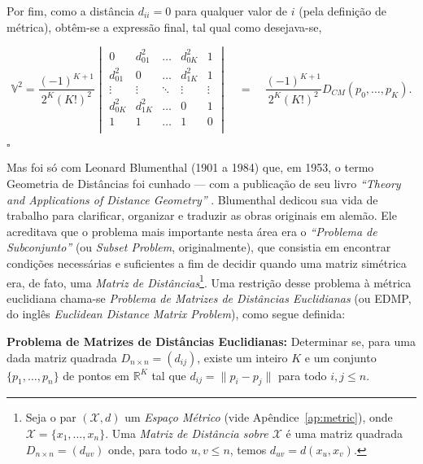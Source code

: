 Por fim, como a distância $d_{ii} = 0$ para qualquer valor de $i$ (pela definição de métrica), obtêm-se a expressão final, tal qual como desejava-se,

\begin{equation*}
\mathbb{V}^2 = \frac{(-1)^{K+1}}{2^{K}(K!)^2} 
\begin{vmatrix}
0 & d^2_{01} & \ldots & d^2_{0K} & 1\\ 
d^2_{01} & 0 & \ldots & d^2_{1K} & 1\\ 
\vdots & \vdots & \ddots & \vdots & \vdots \\ 
d^2_{0K} & d^2_{1K} & \ldots & 0 & 1\\
1 & 1 & \ldots & 1 & 0\\ 
\end{vmatrix} \quad = \quad \frac{(-1)^{K+1}}{2^{K}(K!)^2} D_{CM}(p_0,\dots,p_K).
\end{equation*}
\begin{flushright}
	$\square$
\end{flushright}

Mas foi só com Leonard Blumenthal (1901 a 1984) que, em 1953, o termo Geometria de Distâncias foi cunhado --- com a publicação de seu livro \textit{``Theory and Applications of Distance Geometry''} \cite{Blumenthal:53}.
Blumenthal dedicou sua vida de trabalho para clarificar, organizar e traduzir as obras originais em alemão. Ele acreditava que o problema mais importante nesta área era o \textit{``Problema de Subconjunto''} (ou \textit{Subset Problem}, originalmente), que consistia em encontrar condições necessárias e suficientes a fim de decidir quando uma matriz simétrica era, de fato, uma \textit{Matriz de Distâncias}\footnote{Seja o par $(\mathcal{X}, d)$ um \textit{Espaço Métrico} (vide Apêndice~\ref{ap:metric}), onde $\mathcal{X} = \{x_1, \dots, x_n\}$. Uma \textit{Matriz de Distância sobre $\mathcal{X}$} é uma matriz quadrada $D_{n\times n} = (d_{uv})$ onde, para todo $u,v \leq n$, temos $d_{uv} = d(x_u,x_v)$.}. Uma restrição desse problema à métrica euclidiana chama-se \textit{Problema de Matrizes de Distâncias Euclidianas} (ou EDMP, do inglês \textit{Euclidean Distance Matrix Problem}), como segue definida:

\begin{center}
	\begin{minipage}{0.9 \linewidth}
		\label{EDMP}
		\textbf{Problema de Matrizes de Distâncias Euclidianas:} Determinar se, para uma dada matriz quadrada $D_{n\times n} = (d_{ij})$, existe um inteiro $K$ e um conjunto $\{p_1, \dots, p_n \}$ de pontos em $\mathbb{R}^K$ tal que $d_{ij} = \lVert p_i - p_j\rVert$ para todo $i,j \leq n$.
	\end{minipage}
\end{center} 

